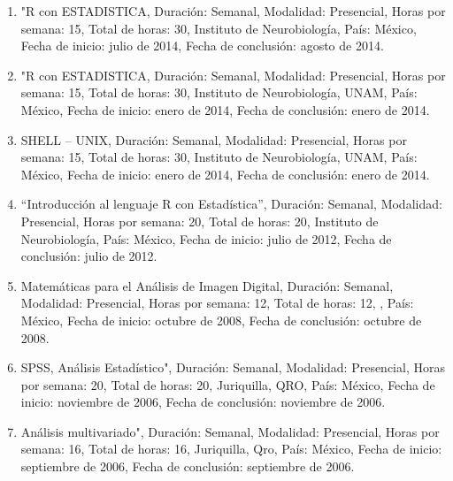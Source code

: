 \begin{enumerate}
\item "R con ESTADISTICA, Duración: Semanal, Modalidad: Presencial, Horas por semana: 15, Total de horas: 30, Instituto de 
Neurobiología, País: México, Fecha de inicio: julio de 2014, Fecha de
conclusión: agosto de 2014.

\item "R con ESTADISTICA, Duración: Semanal, Modalidad: Presencial, Horas por semana: 15, Total de horas: 30, Instituto de 
Neurobiología, UNAM, País: México, Fecha de inicio: enero de 2014, Fecha de conclusión: enero de 2014.

\item  SHELL – UNIX, Duración: Semanal, Modalidad: Presencial, Horas por semana: 15, Total de horas: 30, Instituto de 
Neurobiología, UNAM, País: México, Fecha de inicio: enero de 2014, Fecha de conclusión: enero de 2014.

\item  “Introducción al lenguaje R con Estadística”, Duración: Semanal, Modalidad: Presencial, Horas por semana: 20, Total de 
horas: 20, Instituto de Neurobiología, País: México, Fecha de inicio: julio de 2012, Fecha de conclusión: julio de 2012.

\item  Matemáticas para el Análisis de Imagen Digital, Duración: Semanal, Modalidad: Presencial, Horas por semana: 12, Total 
de 
horas: 12, , País: México, Fecha de inicio: octubre de 2008, Fecha de conclusión: octubre de 2008.

\item  SPSS, Análisis Estadístico", Duración: Semanal, Modalidad: Presencial, Horas por semana: 20, Total de horas: 20, 
Juriquilla, QRO, País: México, Fecha de inicio: noviembre de 2006, Fecha de conclusión: noviembre de 2006.

\item  Análisis multivariado", Duración: Semanal, Modalidad: Presencial, Horas por semana: 16, Total de horas: 16, 
Juriquilla, 
Qro, País: México, Fecha de inicio: septiembre de 2006, Fecha de conclusión: septiembre de 2006.

\end{enumerate}

